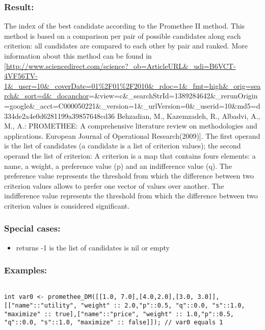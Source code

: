 \documentclass[]{book}
\providecommand{\tightlist}{%
  \setlength{\itemsep}{0pt}\setlength{\parskip}{0pt}}
\theoremstyle{definition}
\theoremstyle{definition}
\theoremstyle{definition}
\theoremstyle{remark}
\begin{document}
\subsubsection{Result:}\label{result-405}

The index of the best candidate according to the Promethee II method.
This method is based on a comparison per pair of possible candidates
along each criterion: all candidates are compared to each other by pair
and ranked. More information about this method can be found in
{[}\url{http://www.sciencedirect.com/science?_ob=ArticleURL\&_udi=B6VCT-4VF56TV-1\&_user=10\&_coverDate=01\%2F01\%2F2010\&_rdoc=1\&_fmt=high\&_orig=search\&_sort=d\&_docanchor}=\&view=c\&\_searchStrId=1389284642\&\_rerunOrigin=google\&\_acct=C000050221\&\_version=1\&\_urlVersion=0\&\_userid=10\&md5=d334de2a4e0d6281199a39857648cd36
Behzadian, M., Kazemzadeh, R., Albadvi, A., M., A.: PROMETHEE: A
comprehensive literature review on methodologies and applications.
European Journal of Operational Research(2009){]}. The first operand is
the list of candidates (a candidate is a list of criterion values); the
second operand the list of criterion: A criterion is a map that contains
fours elements: a name, a weight, a preference value (p) and an
indifference value (q). The preference value represents the threshold
from which the difference between two criterion values allows to prefer
one vector of values over another. The indifference value represents the
threshold from which the difference between two criterion values is
considered significant.

\subsubsection{Special cases:}\label{special-cases-114}

\begin{itemize}
\tightlist
\item
  returns -1 is the list of candidates is nil or empty
\end{itemize}

\subsubsection{Examples:}\label{examples-292}

\begin{verbatim}
 
int var0 <- promethee_DM([[1.0, 7.0],[4.0,2.0],[3.0, 3.0]], [["name"::"utility", "weight" :: 2.0,"p"::0.5, "q"::0.0, "s"::1.0, "maximize" :: true],["name"::"price", "weight" :: 1.0,"p"::0.5, "q"::0.0, "s"::1.0, "maximize" :: false]]); // var0 equals 1
\end{verbatim}
\end{document}
